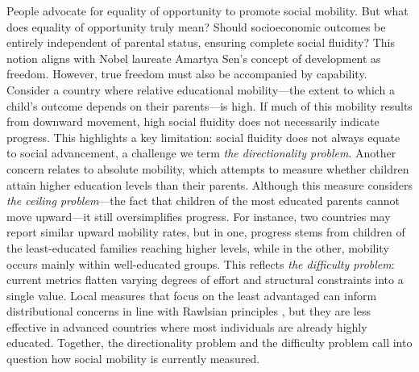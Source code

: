 People advocate for equality of opportunity to promote social mobility. But what does equality of opportunity truly mean? Should socioeconomic outcomes be entirely independent of parental status, ensuring complete social fluidity? This notion aligns with Nobel laureate Amartya Sen’s concept of development as freedom\nocite{sen2000development}. However, true freedom must also be accompanied by capability. Consider a country where relative educational mobility—the extent to which a child's outcome depends on their parents—is high. If much of this mobility results from downward movement, high social fluidity does not necessarily indicate progress. This highlights a key limitation: social fluidity does not always equate to social advancement, a challenge we term \textit{the directionality problem}. Another concern relates to absolute mobility, which attempts to measure whether children attain higher education levels than their parents. Although this measure considers \textit{the ceiling problem}—the fact that children of the most educated parents cannot move upward—it still oversimplifies progress. For instance, two countries may report similar upward mobility rates, but in one, progress stems from children of the least-educated families reaching higher levels, while in the other, mobility occurs mainly within well-educated groups. This reflects \textit{the difficulty problem}: current metrics flatten varying degrees of effort and structural constraints into a single value. Local measures that focus on the least advantaged can inform distributional concerns in line with Rawlsian principles \citep{Rawls1971}, but they are less effective in advanced countries where most individuals are already highly educated. Together, the directionality problem and the difficulty problem call into question how social mobility is currently measured.

